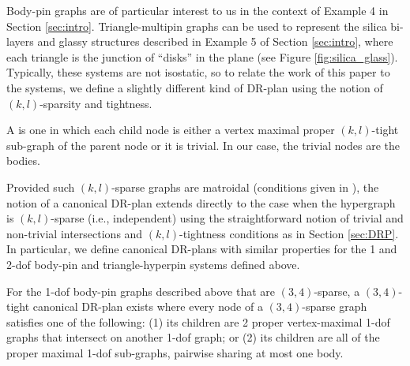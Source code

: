 Body-pin graphs are of particular interest to us in the context of Example 4 in Section \ref{sec:intro}. Triangle-multipin graphs can be used to represent the silica bi-layers and glassy structures described in Example 5 of Section \ref{sec:intro}, where each triangle is the junction of ``disks'' in the plane (see Figure \ref{fig:silica_glass}). Typically, these systems are not isostatic, so to relate the work of this paper to the systems, we define a slightly different kind of DR-plan using the notion of $(k,l)$-sparsity and tightness.

\begin{definition}
    A  is one in which each child node is either a vertex maximal proper $(k,l)$-tight sub-graph of the parent node or it is trivial. In our case, the trivial nodes are the bodies.
\end{definition}

Provided such $(k,l)$-sparse graphs are matroidal (conditions given in \cite{Lee:2007:PGA}),
the notion of a canonical DR-plan extends directly to the case when the hypergraph is $(k,l)$-sparse (i.e., independent) using the straightforward notion of trivial and non-trivial intersections and $(k,l)$-tightness conditions as in Section \ref{sec:DRP}. In particular, we define canonical DR-plans with similar properties for the 1 and 2-dof body-pin and triangle-hyperpin systems defined above.

\begin{observation*}
\label{obs:bodypin_drp}
For the 1-dof body-pin graphs described above that are $(3,4)$-sparse, a $(3,4)$-tight canonical DR-plan exists where every node of a $(3,4)$-sparse graph satisfies one of the following: (1) its children are 2 proper vertex-maximal 1-dof graphs that intersect on another 1-dof graph; or (2) its children are all of the proper maximal 1-dof sub-graphs, pairwise sharing at most one body.
\end{observation*}


